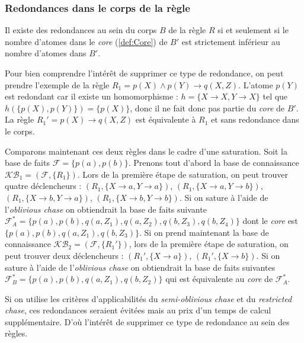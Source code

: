 \subsubsection{Redondances dans le corps de la règle}\label{sec:redondances_corps}
\par Il existe des redondances au sein du corps $B$ de la règle $R$ si et seulement si le nombre d'atomes dans le \textit{core} (\ref{def:Core}) de $B'$ est strictement inférieur au nombre d'atomes dans $B'$. 
\par Pour bien comprendre l'intérêt de supprimer ce type de redondance, on peut prendre l'exemple de la règle $R_1 = p(X) \land p(Y) \rightarrow q(X, Z)$. L'atome $p(Y)$ est redondant car il existe un homomorphisme : $h = \{ X \rightarrow X, Y \rightarrow X \} $ tel que $h(\{p(X), p(Y)\}) = \{p(X)\}$, donc il ne fait donc pas partie du \textit{core} de $B'$. La règle $R_1' = p(X) \rightarrow q(X, Z)$ est équivalente à $R_1$ et sans redondance dans le corps.
\par Comparons maintenant ces deux règles dans le cadre d'une saturation. Soit la base de faits $\mathcal{F} = \{p(a), p(b)\}$. Prenons tout d'abord la base de connaissance $\mathcal{KB}_1 = (\mathcal{F}, \{R_1\})$. Lors de la première étape de saturation, on peut trouver quatre déclencheurs : $(R_1,\{ X \rightarrow a, Y \rightarrow a\})$, $(R_1, \{ X \rightarrow a, Y \rightarrow b\})$, $(R_1, \{ X \rightarrow b, Y \rightarrow a\})$, $(R_1, \{ X \rightarrow b, Y \rightarrow b\})$. Si on sature à l'aide de l'\textit{oblivious chase} on obtiendrait la base de faits suivante $\mathcal{F}^*_A = \{p(a), p(b), q(a,Z_1), q(a,Z_2), q(b, Z_3), q(b, Z_4)\}$ dont le \textit{core} est $\{p(a), p(b), q(a,Z_1), q(b,Z_3)\}$. Si on prend maintenant la base de connaissance $\mathcal{KB}_2 = (\mathcal{F}, \{R_1'\})$, lors de la première étape de saturation, on peut trouver deux déclencheurs : $(R_1',\{ X \rightarrow a\})$, $(R_1', \{ X \rightarrow b\})$. Si on sature à l'aide de l'\textit{oblivious chase} on obtiendrait la base de faits suivantes $\mathcal{F}^{*}_B = \{p(a), p(b), q(a,Z_1), q(b,Z_2)\}$ qui est équivalente au \textit{core} de $\mathcal{F}^*_A$. 
\par Si on utilise les critères d'applicabilités du \textit{semi-oblivious chase} et du \textit{restricted chase}, ces redondances seraient évitées mais au prix d'un temps de calcul supplémentaire. D'où l'intérêt de supprimer ce type de redondance au sein des règles.


